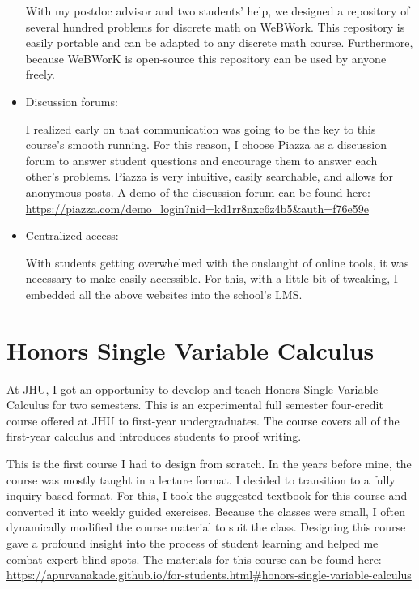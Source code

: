 \documentclass[
]{report}
\begin{document}
\begin{itemize}
  With my postdoc advisor and two students' help, we designed a repository of several hundred problems for discrete math on WeBWork.
  This repository is easily portable and can be adapted to any discrete math course.
  Furthermore, because WeBWorK is open-source this repository can be used by anyone freely.
\item
  Discussion forums:

  I realized early on that communication was going to be the key to this course's smooth running. For this reason, I choose Piazza as a discussion forum to answer student questions and encourage them to answer each other's problems. Piazza is very intuitive, easily searchable, and allows for anonymous posts.
  A demo of the discussion forum can be found here: \url{https://piazza.com/demo_login?nid=kd1rr8nxc6z4b5\&auth=f76e59e}
\item
  Centralized access:

  With students getting overwhelmed with the onslaught of online tools, it was necessary to make easily accessible. For this, with a little bit of tweaking, I embedded all the above websites into the school's LMS.
\end{itemize}

\hypertarget{honors-single-variable-calculus}{%
\section{Honors Single Variable Calculus}\label{honors-single-variable-calculus}}

At JHU, I got an opportunity to develop and teach Honors Single Variable Calculus for two semesters. This is an
experimental full semester four-credit course offered at JHU to first-year undergraduates. The course covers
all of the first-year calculus and introduces students to proof writing.

This is the first course I had to design from scratch. In the years before mine, the course was mostly taught
in a lecture format. I decided to transition to a fully inquiry-based format. For this, I took the suggested
textbook for this course and converted it into weekly guided exercises. Because the classes were small, I
often dynamically modified the course material to suit the class. Designing this course gave a profound
insight into the process of student learning and helped me combat expert blind spots. The materials for this
course can be found here: \url{https://apurvanakade.github.io/for-students.html\#honors-single-variable-calculus}
\end{document}

